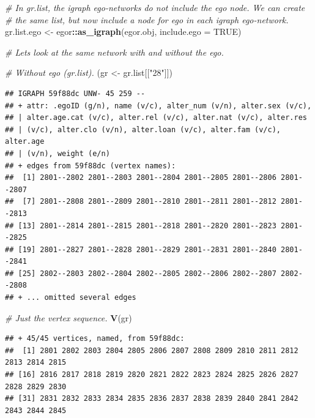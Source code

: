 \documentclass[
]{book}
\newenvironment{Shaded}{\begin{snugshade}}{\end{snugshade}}
\newcommand{\AttributeTok}[1]{\textcolor[rgb]{0.13,0.29,0.53}{#1}}
\newcommand{\CommentTok}[1]{\textcolor[rgb]{0.56,0.35,0.01}{\textit{#1}}}
\newcommand{\ConstantTok}[1]{\textcolor[rgb]{0.56,0.35,0.01}{#1}}
\newcommand{\FunctionTok}[1]{\textcolor[rgb]{0.13,0.29,0.53}{\textbf{#1}}}
\newcommand{\NormalTok}[1]{#1}
\newcommand{\OtherTok}[1]{\textcolor[rgb]{0.56,0.35,0.01}{#1}}
\newcommand{\SpecialCharTok}[1]{\textcolor[rgb]{0.81,0.36,0.00}{\textbf{#1}}}
\newcommand{\StringTok}[1]{\textcolor[rgb]{0.31,0.60,0.02}{#1}}
\begin{document}
\begin{Shaded}
\begin{Highlighting}[]
\CommentTok{\# In gr.list, the igraph ego{-}networks do not include the ego node. We can create}
\CommentTok{\# the same list, but now include a node for ego in each igraph ego{-}network.}
\NormalTok{gr.list.ego }\OtherTok{\textless{}{-}}\NormalTok{ egor}\SpecialCharTok{::}\FunctionTok{as\_igraph}\NormalTok{(egor.obj, }\AttributeTok{include.ego =} \ConstantTok{TRUE}\NormalTok{)}

\CommentTok{\# Let\textquotesingle{}s look at the same network with and without the ego.}

\CommentTok{\# Without ego (gr.list).}
\NormalTok{(gr }\OtherTok{\textless{}{-}}\NormalTok{ gr.list[[}\StringTok{"28"}\NormalTok{]])}
\end{Highlighting}
\end{Shaded}

\begin{verbatim}
## IGRAPH 59f88dc UNW- 45 259 -- 
## + attr: .egoID (g/n), name (v/c), alter_num (v/n), alter.sex (v/c),
## | alter.age.cat (v/c), alter.rel (v/c), alter.nat (v/c), alter.res
## | (v/c), alter.clo (v/n), alter.loan (v/c), alter.fam (v/c), alter.age
## | (v/n), weight (e/n)
## + edges from 59f88dc (vertex names):
##  [1] 2801--2802 2801--2803 2801--2804 2801--2805 2801--2806 2801--2807
##  [7] 2801--2808 2801--2809 2801--2810 2801--2811 2801--2812 2801--2813
## [13] 2801--2814 2801--2815 2801--2818 2801--2820 2801--2823 2801--2825
## [19] 2801--2827 2801--2828 2801--2829 2801--2831 2801--2840 2801--2841
## [25] 2802--2803 2802--2804 2802--2805 2802--2806 2802--2807 2802--2808
## + ... omitted several edges
\end{verbatim}

\begin{Shaded}
\begin{Highlighting}[]
\CommentTok{\# Just the vertex sequence.}
\FunctionTok{V}\NormalTok{(gr)}
\end{Highlighting}
\end{Shaded}

\begin{verbatim}
## + 45/45 vertices, named, from 59f88dc:
##  [1] 2801 2802 2803 2804 2805 2806 2807 2808 2809 2810 2811 2812 2813 2814 2815
## [16] 2816 2817 2818 2819 2820 2821 2822 2823 2824 2825 2826 2827 2828 2829 2830
## [31] 2831 2832 2833 2834 2835 2836 2837 2838 2839 2840 2841 2842 2843 2844 2845
\end{verbatim}
\end{document}
